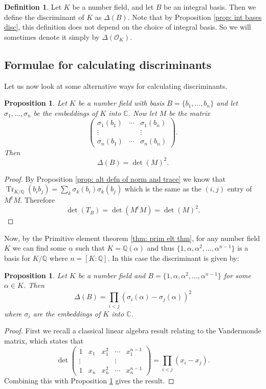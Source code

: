 \documentclass[11pt,a4paper]{report}
\theoremstyle{plain}
\newtheorem{prop}[subsection]{Proposition}
\theoremstyle{definition}
\newtheorem{defn}[subsection]{Definition}
\theoremstyle{definition}
\newcommand{\Tr}{\operatorname{Tr}}
\def\CC{\mathbb{C}}
\def\QQ{\mathbb{Q}}
\def \a{\alpha}
\def \OO {\mathcal{O}}
\begin{document}
\begin{defn}\label{defn: disc of num field}
	Let $K$ be a number field, and let $B$ be an integral basis. Then we define the discriminant of $K$ as $\Delta(B)$.   Note that by Proposition \ref{prop: int bases disc}, this definition does not depend on the choice of integral basis. So we will sometimes denote it simply by $\Delta(\OO_K)$.
\end{defn}


\subsection{Formulae for calculating discriminants}

Let us now look at some alternative ways for calculating discriminants.

\begin{prop}\label{prop: disc via embs}
	Let $K$ be a number field with basis $B=\{b_1,\dots,b_n\}$ and let $\sigma_1,\dots,\sigma_n$ be the embeddings of $K$ into $\CC$. Now let $M$ be the matrix  \[\left (\begin{matrix} \sigma_1(b_1) &\cdots& \sigma_1(b_n)\\ \vdots & & \vdots \\  \sigma_n(b_1) &\cdots& \sigma_n(b_n)
	\end{matrix} \right ).\] Then \[\Delta(B)=\det(M)^2.\]
\end{prop}


\begin{proof}
	By Proposition \ref{prop: alt defn of norm and trace} we know that  $\Tr_{K/\QQ}(b_i b_j)= \sum_k \sigma_k(b_i)\sigma_k(b_j)$ which is the same as the $(i,j)$ entry of $M^t M$. Therefore \[\det(T_B)=\det(M^t M)=\det(M)^2.\]
\end{proof}

Now, by the Primitive element theorem \ref{thm: prim elt thm}, for any number field $K$ we can find some $\a$ such that $K=\QQ(\a)$ and thus $\{1,\a,\a^2,\dots,\a^{n-1}\}$ is a basis for $K/\QQ$ where $n=[K:\QQ]$. In this case the discriminant is given by:

\begin{prop}\label{prop: disc of prim elt basis}
	Let $K$ be a number field and $B=\{1,\a,\a^2,\dots,\a^{n-1}\}$ for some $\a \in K$. Then \[\Delta(B)=\prod_{i < j} (\sigma_i(\a)-\sigma_j(\a))^2\] where $\sigma_i$ are the embeddings of $K $ into $\CC$.
\end{prop}

\begin{proof}
	First we recall a classical linear algebra result relating to the Vandermonde matrix, which states that  \[\det \left (\begin{matrix} 1 & x_1& x_1^2&\cdots&x_1^{n-1} \\ \vdots & & & \vdots \\   1 & x_n& x_n^2&\cdots&x_n^{n-1}
	\end{matrix} \right ) =\prod_{i<j} (x_i-x_j).\] Combining this with Proposition \ref{prop: disc via embs} gives the result.
\end{proof}
\end{document}
